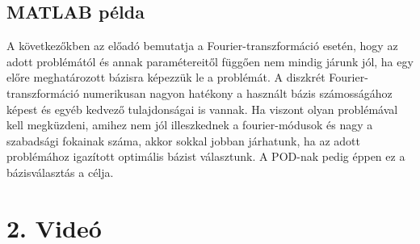             \subsection*{MATLAB példa}
                A következőkben az előadó bemutatja a Fourier-transzformáció esetén, hogy az adott problémától és annak paramétereitől függően nem mindig járunk jól, ha egy előre meghatározott bázisra képezzük le a problémát. A diszkrét Fourier-transzformáció numerikusan nagyon hatékony a használt bázis számosságához képest és egyéb kedvező tulajdonságai is vannak. Ha viszont olyan problémával kell megküzdeni, amihez nem jól illeszkednek a fourier-módusok és nagy a szabadsági fokainak száma, akkor sokkal jobban járhatunk, ha az adott problémához igazított optimális bázist választunk. A POD-nak pedig éppen ez a bázisválasztás a célja.
    \newpage
        \section*{2. Videó}



 
